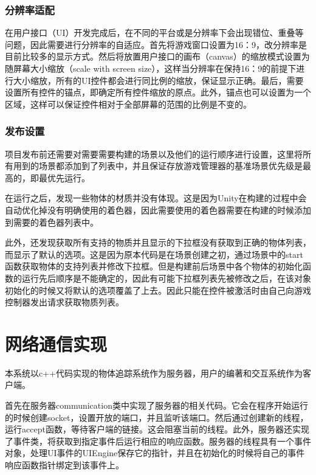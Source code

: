 \subsubsection{分辨率适配}

    在用户接口（UI）开发完成后，在不同的平台或是分辨率下会出现错位、重叠等问题，因此需要进行分辨率的自适应。首先将游戏窗口设置为16：9，改分辨率是目前比较多的显示方式。然后将放置用户接口的画布（canvas）的缩放模式设置为随屏幕大小缩放（scale with screen size），这样当分辨率在保持16：9的前提下进行大小缩放，所有的UI控件都会进行同比例的缩放，保证显示正确。最后，需要设置所有控件的锚点，即确定所有控件缩放的原点。此外，锚点也可以设置为一个区域，这样可以保证控件相对于全部屏幕的范围的比例是不变的。
    
\subsubsection{发布设置}

    项目发布前还需要对需要需要构建的场景以及他们的运行顺序进行设置，这里将所有用到的场景都添加到了列表中，并且保证存放游戏管理器的基准场景优先级是最高的，即最优先运行。
    
    在运行之后，发现一些物体的材质并没有体现。这是因为Unity在构建的过程中会自动优化掉没有明确使用的着色器，因此需要使用的着色器需要在构建的时候添加到需要的着色器列表中。
    
    此外，还发现获取所有支持的物质并且显示的下拉框没有获取到正确的物体列表，而显示了默认的选项。这是因为原本代码是在场景创建之初，通过场景中的start函数获取物体的支持列表并修改下拉框。但是构建前后场景中各个物体的初始化函数的运行先后顺序是不能确定的，因此有可能下拉框列表先被修改之后，在该对象初始化的时候又将默认的选项覆盖了上去。因此只能在控件被激活时由自己向游戏控制器发出请求获取物质列表。
    
\section{网络通信实现}

本系统以c++代码实现的物体追踪系统作为服务器，用户的编著和交互系统作为客户端。

首先在服务器communication类中实现了服务器的相关代码。它会在程序开始运行的时候创建socket，设置开放的端口，并且监听该端口。然后通过创建新的线程，运行accept函数，等待客户端的链接。这会阻塞当前的线程。此外，服务器还实现了事件类，将获取到指定事件后运行相应的响应函数。服务器的线程具有一个事件对象，处理UI事件的UIEngine保存它的指针，并且在初始化的时候将自己的事件响应函数指针绑定到该事件上。

